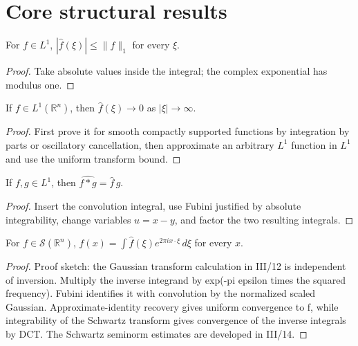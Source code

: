 \section{Core structural results}

\begin{theorem}[$L^1$ bound]\label{thm:iii11-01}
For $f\in L^1$, $|\widehat f(\xi)|\le\|f\|_1$ for every $\xi$.
\begin{proof}
Take absolute values inside the integral; the complex exponential has modulus one.
\end{proof}
\end{theorem}

\begin{theorem}\label{thm:iii11-02}
If $f\in L^1(\mathbb R^n)$, then $\widehat f(\xi)\to0$ as $|\xi|\to\infty$.
\begin{proof}
First prove it for smooth compactly supported functions by integration by parts or oscillatory cancellation, then approximate an arbitrary $L^1$ function in $L^1$ and use the uniform transform bound.
\end{proof}
\end{theorem}

\begin{theorem}\label{thm:iii11-03}
If $f,g\in L^1$, then $\widehat{f*g}=\widehat f\,\widehat g$.
\begin{proof}
Insert the convolution integral, use Fubini justified by absolute integrability, change variables $u=x-y$, and factor the two resulting integrals.
\end{proof}
\end{theorem}

\begin{theorem}\label{thm:iii11-04}
For $f\in\mathcal S(\mathbb R^n)$, $f(x)=\int\widehat f(\xi)e^{2\pi ix\cdot\xi}\,d\xi$ for every $x$.
\begin{proof}
Proof sketch: the Gaussian transform calculation in III/12 is independent of inversion. Multiply the inverse integrand by exp(-pi epsilon times the squared frequency). Fubini identifies it with convolution by the normalized scaled Gaussian. Approximate-identity recovery gives uniform convergence to f, while integrability of the Schwartz transform gives convergence of the inverse integrals by DCT. The Schwartz seminorm estimates are developed in III/14.
\end{proof}
\end{theorem}

